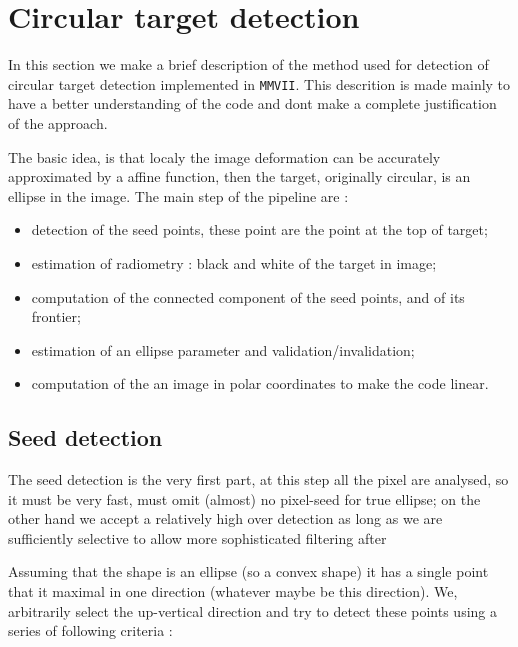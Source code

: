 \section{Circular target detection}

In this section we make a brief description of the method used for 
detection of circular target detection implemented in {\tt MMVII}.
This descrition is made mainly to have a better understanding of the code and dont
make a complete justification of the approach.



The basic idea, is that localy the image deformation can be accurately approximated
by a affine function, then the target,  originally circular, is an ellipse in the image.
The main step of the pipeline are :

\begin{itemize}
       \item detection of the seed points, these point are the point at the top of target;

       \item estimation of radiometry : black and white of the target in image;

       \item computation of the connected component of the seed points, and of its frontier;

       \item estimation of an ellipse parameter and validation/invalidation;

       \item computation of the an image in polar coordinates to make the code linear.

\end{itemize}


\subsection{Seed detection}

The seed detection is the very first part, at this step all the pixel are analysed,
so it must be very fast, must omit (almost) no pixel-seed for true ellipse; on the
other hand we accept a relatively high over detection as long as we are sufficiently
selective to allow more sophisticated filtering after 

Assuming that the shape is an ellipse (so a convex shape)
it has a single point that it maximal in one direction (whatever maybe be this direction).
We, arbitrarily select the up-vertical direction and try to detect these points using a
series of following criteria :

